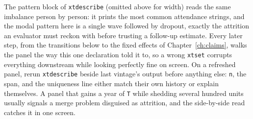 \documentclass[
    a4paper,
    fontsize=10pt,
    twoside=true,
    numbers=noenddot,
]{kaobook}
\begin{document}
The pattern block of \texttt{xtdescribe} (omitted above for width) reads the same imbalance person by person: it prints the most common attendance strings, and the modal pattern here is a single wave followed by dropout, exactly the attrition an evaluator must reckon with before trusting a follow-up estimate. Every later step, from the transitions below to the fixed effects of Chapter~\ref{ch:claims}, walks the panel the way this one declaration told it to, so a wrong \texttt{xtset} corrupts everything downstream while looking perfectly fine on screen. On a refreshed panel, rerun \texttt{xtdescribe} beside last vintage's output before anything else: \texttt{n}, the span, and the uniqueness line either match their own history or explain themselves. A panel that gains a year of \texttt{T} while shedding several hundred units usually signals a merge problem disguised as attrition, and the side-by-side read catches it in one screen.
\end{document}
